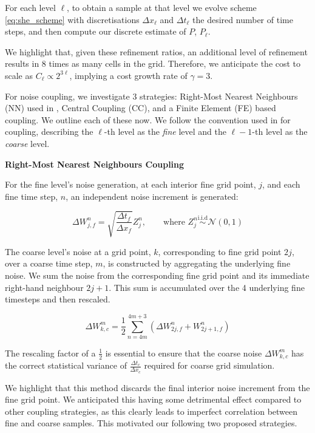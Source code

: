 For each level $\ell$, to obtain a sample at that level we evolve scheme \eqref{eq:she_scheme} 
with discretisations $\Delta x_\ell$ and $\Delta t_\ell$ the desired number of time steps, 
and then compute our discrete estimate of $P$, $P_\ell$. 

We highlight that, given these refinement ratios, an additional level 
of refinement results in 8 times as many cells in the grid. Therefore, 
we anticipate the cost to scale as $C_\ell \propto 2^{3\ell}$, implying a 
cost growth rate of $\gamma = 3$.

For noise coupling, we investigate 3 strategies: Right-Most Nearest Neighbours (NN)
used in \cite{cornalba2025multilevel}, Central Coupling (CC), and a Finite Element (FE)
based coupling. We outline each of these now. We follow the convention used in 
\cite{giles2015multilevel} for coupling, describing the $\ell$-th level as 
the \textit{fine} level and the $\ell - 1$-th level as the \textit{coarse} level.
\newline

\textbf{Right-Most Nearest Neighbours Coupling}

For the fine level's noise generation, at each interior fine grid point, $j$, and each fine 
time step, $n$, an independent noise increment is generated:

\begin{equation*}
    \Delta W_{j,f}^n = \sqrt{\frac{\Delta t_f}{\Delta x_f}} Z_j^n, \qquad \text{where } 
    Z_j^n \overset{\mathrm{i.i.d}}{\sim} \mathcal{N}(0,1)
\end{equation*}

The coarse level's noise at a grid point, $k$,
corresponding to fine grid point $2j$,
over a coarse time step, $m$, is constructed by 
aggregating the underlying fine noise. We sum 
the noise from the corresponding fine grid point
and its immediate right-hand neighbour
$2j + 1$. This sum is accumulated over 
the 4 underlying fine timesteps 
and then rescaled.

\begin{equation*}
    \Delta W_{k,c}^m = \frac{1}{2} \sum_{n = 4m}^{4m+3}
    \left(\Delta W_{2j,f}^n + W_{2j+1, f}^n \right)
\end{equation*}

The rescaling factor of a $\frac{1}{2}$ is essential to 
ensure that the coarse noise $\Delta W_{k,c}^m$
has the correct statistical variance of 
$\frac{\Delta t_c}{\Delta x_c}$ required for 
coarse grid simulation.

We highlight that this method discards the final 
interior noise increment from the fine grid
point. We anticipated this having some 
detrimental effect compared to 
other coupling strategies, as 
this clearly leads to imperfect correlation
between fine and coarse samples.
This motivated our following two proposed strategies.
\newline

